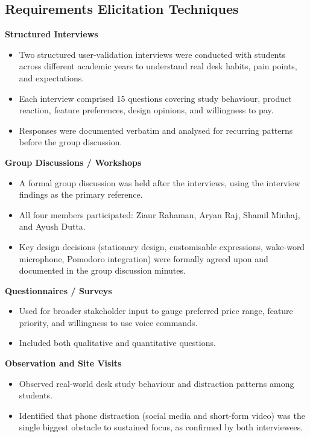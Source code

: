\documentclass[12pt,a4paper]{article}
\begin{document}
\subsection*{Requirements Elicitation Techniques}

\textbf{Structured Interviews}
\begin{itemize}[leftmargin=*]
\item Two structured user-validation interviews were conducted with
      students across different academic years to understand real desk
      habits, pain points, and expectations.
\item Each interview comprised 15 questions covering study behaviour,
      product reaction, feature preferences, design opinions, and
      willingness to pay.
\item Responses were documented verbatim and analysed for recurring
      patterns before the group discussion.
\end{itemize}

\textbf{Group Discussions / Workshops}
\begin{itemize}[leftmargin=*]
\item A formal group discussion was held after the interviews, using the
      interview findings as the primary reference.
\item All four members participated: Ziaur Rahaman, Aryan Raj, Shamil
      Minhaj, and Ayush Dutta.
\item Key design decisions (stationary design, customisable expressions,
      wake-word microphone, Pomodoro integration) were formally agreed
      upon and documented in the group discussion minutes.
\end{itemize}

\textbf{Questionnaires / Surveys}
\begin{itemize}[leftmargin=*]
\item Used for broader stakeholder input to gauge preferred price range,
      feature priority, and willingness to use voice commands.
\item Included both qualitative and quantitative questions.
\end{itemize}

\textbf{Observation and Site Visits}
\begin{itemize}[leftmargin=*]
\item Observed real-world desk study behaviour and distraction patterns
      among students.
\item Identified that phone distraction (social media and short-form
      video) was the single biggest obstacle to sustained focus, as
      confirmed by both interviewees.
\end{itemize}
\end{document}

